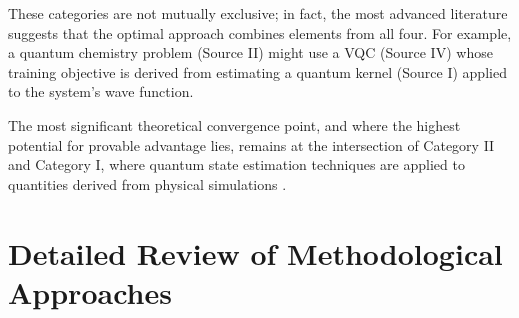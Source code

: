 \documentclass{article}
\begin{document}
These categories are not mutually exclusive; in fact, the most advanced literature suggests that the optimal approach combines elements from all four. For example, a quantum chemistry problem (Source II) might use a VQC (Source IV) whose training objective is derived from estimating a quantum kernel (Source I) applied to the system's wave function.

\begin{table}[ht]
\centering
\caption{Comparison of Category across Source of Hardness, Primary ML Task, Key Concept, Illustrative Papers}
\label{tab:1}
\end{table}

The most significant theoretical convergence point, and where the highest potential for provable advantage lies, remains at the intersection of Category II and Category I, where quantum state estimation techniques are applied to quantities derived from physical simulations \cite{daley2022practical}.

\section{Detailed Review of Methodological Approaches}
\end{document}
